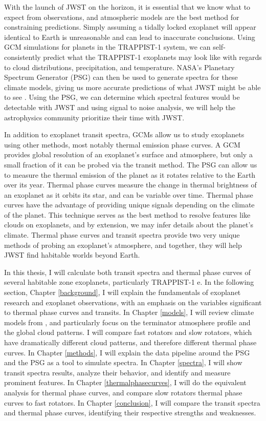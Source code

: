 With the launch of JWST on the horizon, it is essential that we know what to
 expect from observations, and atmospheric models are the best method
 for constraining predictions. Simply assuming a tidally locked
 exoplanet will appear identical to Earth is unreasonable and can lead to
 inaccurate conclusions. Using GCM simulations for planets in the TRAPPIST-1
 system, we can self-consistently predict what the TRAPPIST-1 exoplanets may look
 like with regards to cloud distributions, precipitation, and temperature.
 NASA's Planetary Spectrum Generator (PSG) can then be used to generate spectra
 for these climate models, giving us more accurate predictions of what JWST
 might be
 able to see \citep{psgpaper}. Using the PSG, we can determine which spectral 
 features would be detectable with JWST and using signal to noise analysis, we
 will help the astrophysics community prioritize their time with JWST.

In addition to exoplanet transit spectra, GCMs allow us to study exoplanets
 using other
 methods, most notably thermal emission phase curves. A GCM provides global
 resolution of an exoplanet's surface and atmosphere, but only a small fraction
 of it can be probed via the transit method. The PSG can allow us to measure the
 thermal emission of the planet as it rotates relative to the Earth over its
 year. Thermal phase curves measure the change in thermal brightness of an
 exoplanet as it orbits its star, and can be variable over time. Thermal phase
 curves have the advantage of providing unique signals depending on the climate
 of the planet. This technique
 serves as the best method to resolve features like clouds on exoplanets, and
 by extension, we may infer details about the planet's climate. Thermal phase
 curves and transit spectra provide two very unique methods of probing an
 exoplanet's atmosphere, and together, they will help JWST find habitable worlds
 beyond Earth.

In this thesis, I will calculate both transit spectra and thermal phase curves
 of several habitable zone exoplanets, particularly TRAPPIST-1 e. In the
 following section, Chapter \ref{background}, I will explain the fundamentals of
 exoplanet research and exoplanet observations, with an emphasis on the
 variables significant to thermal phase curves and transits. In Chapter
 \ref{models}, I will review climate models from \citet{wolf17, wolf18}, and
 particularly focus on the terminator atmosphere profile and the global cloud
 patterns. I will compare fast rotators and slow rotators, which have
 dramatically different cloud patterns, and therefore different thermal phase
 curves. In Chapter \ref{methods}, I will explain the data pipeline around the
 PSG and the
 PSG as a tool to simulate spectra. In Chapter \ref{spectra}, I will show
 transit spectra results, analyze their behavior, and identify and measure
 prominent features. In Chapter \ref{thermalphasecurves}, I will do the
 equivalent analysis for thermal phase curves, and compare slow rotators thermal
 phase curves to fast rotators.
 In Chapter \ref{conclusion}, I will compare the transit spectra and thermal
 phase curves, identifying their respective strengths and weaknesses.
